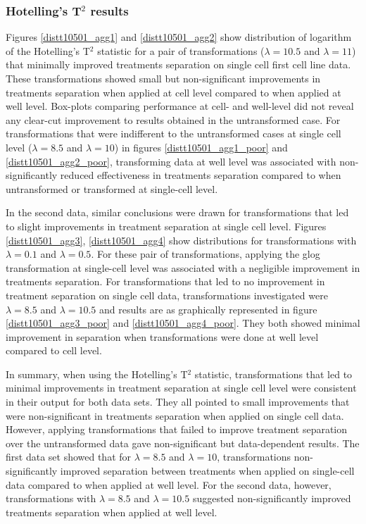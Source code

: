 \documentclass[11pt]{article}
\begin{document}
\subsubsection{Hotelling's T$^2$ results} %
\par{Figures \ref{distt10501_agg1} and \ref{distt10501_agg2} show distribution of logarithm of the Hotelling's T$^2$ statistic for a pair of transformations ($\lambda = 10.5$ and $\lambda = 11$) that minimally improved treatments separation on single cell first cell line data. These transformations showed small but non-significant improvements in treatments separation when applied at cell level compared to when applied at well level. Box-plots comparing performance at cell- and well-level did not reveal any clear-cut improvement to results obtained in the untransformed case. For transformations that were indifferent to the untransformed cases at single cell level ($\lambda = 8.5$ and $\lambda = 10$) in figures \ref{distt10501_agg1_poor} and \ref{distt10501_agg2_poor}, transforming data at well level was associated with non-significantly reduced effectiveness in treatments separation compared to when untransformed or transformed at single-cell level.}
\par{In the second data, similar conclusions were drawn for transformations that led to slight improvements in treatment separation at single cell level. Figures \ref{distt10501_agg3}, \ref{distt10501_agg4} show distributions for transformations with $\lambda = 0.1$ and $\lambda = 0.5$. For these pair of transformations, applying the glog transformation at single-cell level was associated with a negligible improvement in treatments separation. For transformations that led to no improvement in treatment separation on single cell data, transformations investigated were  $\lambda = 8.5$ and $\lambda = 10.5$ and results are as graphically represented in figure \ref{distt10501_agg3_poor} and \ref{distt10501_agg4_poor}. They both showed minimal improvement in separation when transformations were done at well level compared to cell level.}
\par{In summary, when using the Hotelling's T$^2$ statistic, transformations that led to minimal improvements in treatment separation at single cell level were consistent in their output for both data sets. They all pointed to small improvements that were non-significant in treatments separation when applied on single cell data. However, applying transformations that failed to improve treatment separation over the untransformed data gave non-significant but data-dependent results. The first data set showed that for $\lambda = 8.5$ and $\lambda = 10$, transformations non-significantly improved separation between treatments when applied on single-cell data compared to when applied at well level. For the second data, however, transformations with $\lambda = 8.5$ and $\lambda = 10.5$ suggested non-significantly improved treatments separation when applied at well level. }
\end{document}
